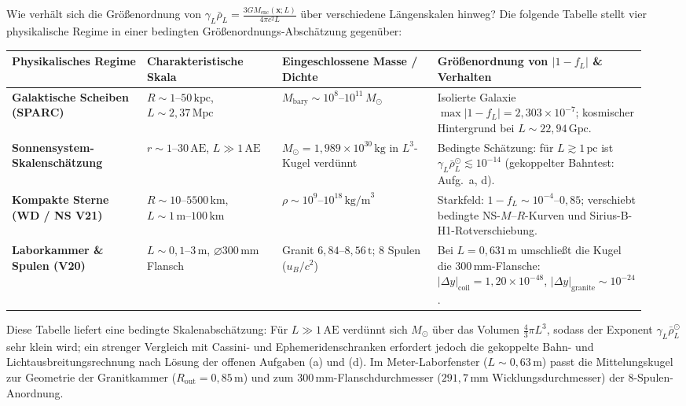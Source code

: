 \documentclass[10pt,a4paper]{article}
\begin{document}
\par
Wie verh\"alt sich die Gr\"o\ss enordnung von $\gamma_L \bar{\rho}_L = \frac{3 G M_{\text{enc}}(\mathbf{x};L)}{4\pi c^2 L}$ \"uber verschiedene L\"angenskalen hinweg? Die folgende Tabelle stellt vier physikalische Regime in einer bedingten Gr\"o\ss enordnungs-Absch\"atzung gegen\"uber:
\begin{center}\vspace{-2pt}
{\footnotesize
\begin{tabular}{@{}>{\bfseries}p{0.20\linewidth}p{0.20\linewidth}p{0.23\linewidth}p{0.31\linewidth}@{}}
\toprule
Physikalisches Regime & Charakteristische Skala & Eingeschlossene Masse / Dichte & Gr\"o\ss enordnung von $|1 - f_L|$ \& Verhalten \\
\midrule
Galaktische Scheiben (SPARC) & $R \sim 1\text{--}50\,\text{kpc}$, $L \sim 2{,}37\,\text{Mpc}$ & $M_{\text{bary}} \sim 10^8\text{--}10^{11}\,M_\odot$ & Isolierte Galaxie $\max|1-f_L| = 2{,}303\times 10^{-7}$; kosmischer Hintergrund bei $L\sim 22{,}94\,\text{Gpc}$. \\
Sonnensystem-Skalensch\"atzung & $r \sim 1\text{--}30\,\text{AE}$, $L \gg 1\,\text{AE}$ & $M_\odot = 1{,}989\times 10^{30}\,\text{kg}$ in $L^3$-Kugel verd\"unnt & Bedingte Sch\"atzung: f\"ur $L \gtrsim 1\,\text{pc}$ ist $\gamma_L\bar{\rho}_L^\odot \lesssim 10^{-14}$ (gekoppelter Bahntest: Aufg.\ a, d). \\
Kompakte Sterne (WD / NS V21) & $R \sim 10\text{--}5500\,\text{km}$, $L \sim 1\,\text{m}\text{--}100\,\text{km}$ & $\rho \sim 10^9\text{--}10^{18}\,\text{kg/m}^3$ & Starkfeld: $1-f_L \sim 10^{-4}\text{--}0{,}85$; verschiebt bedingte NS-$M$--$R$-Kurven und Sirius-B-H1-Rotverschiebung. \\
Laborkammer \& Spulen (V20) & $L \sim 0{,}1\text{--}3\,\text{m}$, $\varnothing 300\,\text{mm}$ Flansch & Granit $6{,}84\text{--}8{,}56\,\text{t}$; 8 Spulen ($u_B/c^2$) & Bei $L=0{,}631\,\text{m}$ umschlie\ss t die Kugel die $300\,\text{mm}$-Flansche: $|\Delta y|_{\text{coil}}=1{,}20\times 10^{-48}$, $|\Delta y|_{\text{granite}}\sim 10^{-24}$. \\
\bottomrule
\end{tabular}}
\end{center}
Diese Tabelle liefert eine bedingte Skalenabsch\"atzung: F\"ur $L \gg 1\,\text{AE}$ verd\"unnt sich $M_\odot$ \"uber das Volumen $\frac{4}{3}\pi L^3$, sodass der Exponent $\gamma_L\bar{\rho}_L^\odot$ sehr klein wird; ein strenger Vergleich mit Cassini- und Ephemeridenschranken erfordert jedoch die gekoppelte Bahn- und Lichtausbreitungsrechnung nach L\"osung der offenen Aufgaben (a) und (d). Im Meter-Laborfenster ($L \sim 0{,}63\,\text{m}$) passt die Mittelungskugel zur Geometrie der Granitkammer ($R_{\text{out}}=0{,}85\,\text{m}$) und zum $300\,\text{mm}$-Flanschdurchmesser ($291{,}7\,\text{mm}$ Wicklungsdurchmesser) der 8-Spulen-Anordnung.
\newpage
\end{document}
